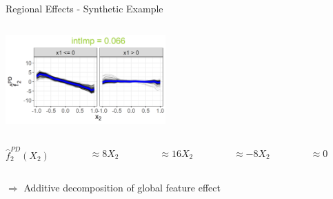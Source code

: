 \documentclass[11pt,compress,t,notes=noshow, aspectratio=169, xcolor=table,dvipsnames]{beamer}
\begin{document}
\begin{frame}{Regional Effects - Synthetic Example}
\begin{columns}[T, totalwidth = \linewidth]
\begin{column}{0.57\textwidth}
{{    \includegraphics[width=0.46\textwidth, trim = 40 0 0 25, clip]{figure/sim1_dt_split2_2.png}
    }

     \begin{columns}[T, totalwidth = \linewidth]
            \begin{column}{0.12\linewidth}
            \centering
             $\hat{f}_2^{PD}(X_2)$ %
         \end{column}
         \begin{column}{0.16\linewidth}
         \centering
             $\approx 8X_2$ %
         \end{column}
        \begin{column}{0.2\linewidth}
\centering
            $\approx 16X_2$ %
         \end{column}
        \begin{column}{0.2\linewidth}
        \centering
            $ \approx -8X_2$ %
         \end{column}        
         \begin{column}{0.2\linewidth}
         \centering
             $\approx 0$%
         \end{column}
     \end{columns}
     \medskip
     $\Rightarrow$ Additive decomposition of global feature effect
}


    \end{column}


\end{columns}
\end{frame}
\end{document}
